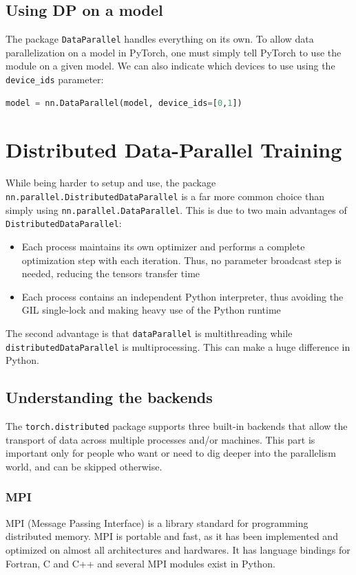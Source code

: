 \documentclass{article}
\begin{document}
\subsection{Using DP on a model}
The package \lstinline{DataParallel} handles everything on its own. To allow data parallelization on a model in PyTorch, one must simply tell PyTorch to use the module on a given model. We can also indicate which devices to use using the \lstinline{device_ids} parameter:

\begin{lstlisting}[language=Python]
model = nn.DataParallel(model, device_ids=[0,1])
\end{lstlisting}

\section{Distributed Data-Parallel Training}
While being harder to setup and use, the package \lstinline{nn.parallel.DistributedDataParallel} is a far more common choice than simply using \lstinline{nn.parallel.DataParallel}. This is due to two main advantages of \lstinline{DistributedDataParallel}:
\begin{itemize}
  \item Each process maintains its own optimizer and performs a complete optimization step with each iteration. Thus, no parameter broadcast step is needed, reducing the tensors transfer time
  \item Each process contains an independent Python interpreter, thus avoiding the GIL single-lock and making heavy use of the Python runtime
\end{itemize}

The second advantage is that \lstinline{dataParallel} is \gls{multithreading} while \lstinline{distributedDataParallel} is \gls{multiprocessing}. This can make a huge difference in Python.

\subsection{Understanding the backends}
The \lstinline{torch.distributed} package supports three built-in backends that allow the transport of data across multiple processes and/or machines. This part is important only for people who want or need to dig deeper into the parallelism world, and can be skipped otherwise.

\subsubsection{MPI}
MPI (Message Passing Interface) is a library standard for programming distributed memory. MPI is portable and fast, as it has been implemented and optimized on almost all architectures and hardwares. It has language bindings for Fortran, C and C++ and several MPI modules exist in Python.
\end{document}
